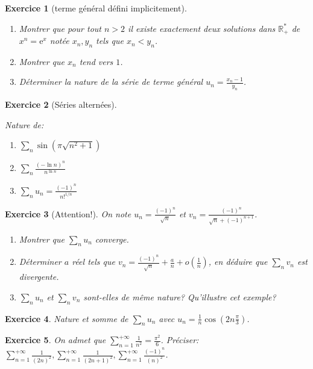 \documentclass[12pt,a4paper]{article}
\newcommand{\R}{\mathbb{R}}
\theoremstyle{break}
\newtheorem{Exo}{Exercice}
\begin{document}
\begin{Exo}[terme général défini implicitement]
	\ 
	\begin{enumerate}
		\item
		Montrer que pour tout $n>2$ il existe exactement deux solutions dans $\R_+^*$ de $x^n=\mathrm{e}^x$ notée $x_n,y_n$ tels que $x_n<y_n$.
		\item
		Montrer que $x_n$ tend vers $1$.
		\item
		Déterminer la nature de la série de terme général $u_n=\frac{x_n-1}{y_n}$.
	\end{enumerate}
\end{Exo}

\begin{Exo}[Séries alternées]
\ 

Nature de:
\begin{multicols}{3}
\begin{enumerate}
	\item
	$\sum_n \sin\left( \pi\sqrt{n^2+1}\right)$
	\item
	$\sum_n \frac{(-\ln n)^n}{n^{\ln n}}$
	\item
	$\sum_{n}u_n=\frac{(-1)^n}{n!^{1/n}}$
\end{enumerate}
\end{multicols}

\end{Exo}

\begin{Exo}[Attention!]
	On note $u_n=
	\frac{(-1)^n}{\sqrt{n}}$ et $v_n=\frac{(-1)^n}{\sqrt{n}+(-1)^{n+1}}$.
	\begin{enumerate}
		\item
		Montrer que $\sum_n u_n$ converge.
		\item
		Déterminer $a$ réel tels que $v_n=\frac{(-1)^n}{\sqrt{n}}+\frac{a}{n}+o\left(\frac{1}{n}\right)$, en déduire que $\sum_n v_n$ est divergente.
		\item
		$\sum_n u_n$ et $\sum_n v_n$ sont-elles de même nature? Qu'illustre cet exemple?
	\end{enumerate}
\end{Exo}

\begin{Exo}
	Nature et somme de $\sum_n u_{n}$ avec $u_{n}=\frac{1}{n}\cos \left( 2n\frac{\pi }{3}\right)$.
\end{Exo}

\begin{Exo}
	On admet que $\sum_{n=1}^{+\infty}\frac{1}{n^2}=\frac{\pi^2}{6}$. Préciser: $\sum_{n=1}^{+\infty}\frac{1}{(2n)^2},\sum_{n=1}^{+\infty}\frac{1}{(2n+1)^2},\sum_{n=1}^{+\infty}\frac{(-1)^n}{(n)^2}$.
\end{Exo}
\end{document}
